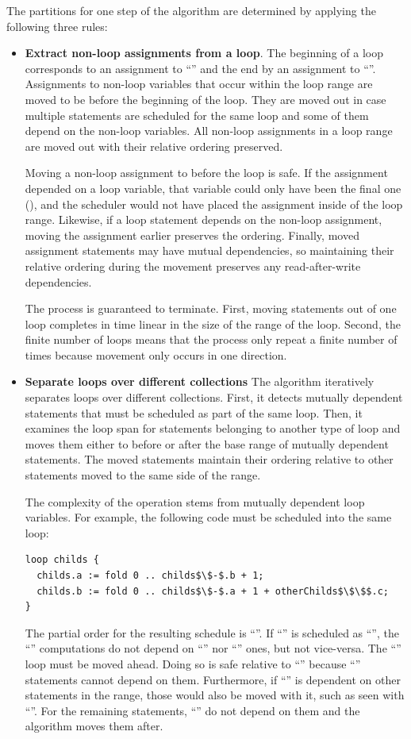 The partitions for one step of the algorithm are determined by applying the following three rules:
\begin{itemize}
\item \textbf{Extract non-loop assignments from a loop}. The beginning of a loop corresponds to an assignment to ``'' and the end by an assignment to ``''. Assignments to non-loop variables that occur within the loop range are moved to be before the beginning of the loop. They are moved out in case multiple statements are scheduled for the same loop and some of them depend on the non-loop variables. All non-loop assignments in a loop range are moved out with their relative ordering preserved.

Moving a non-loop assignment to before the loop is safe. If the assignment depended on a loop variable, that variable could only have been the final one (), and the scheduler would not have placed the assignment inside of the loop range. Likewise, if a loop statement depends on the non-loop assignment, moving the assignment earlier preserves the ordering. Finally, moved assignment statements may have mutual dependencies, so maintaining their relative ordering during the movement preserves any read-after-write dependencies.

The process is guaranteed to terminate. First, moving statements out of one loop completes in time linear in the size of the range of the loop. Second, the finite number of loops means that the process only repeat a finite number of times because movement only occurs in one direction.

\item \textbf{Separate loops over different collections} The algorithm iteratively separates loops over different collections. First, it detects mutually dependent statements that must be scheduled as part of the same loop. Then, it examines the loop span for statements belonging to another type of loop and moves them either to before or after the base range of mutually dependent statements.  The moved statements maintain their ordering relative to other statements moved to the same side of the range.

The complexity of the operation stems from mutually dependent loop variables. For example, the following code must be scheduled into the same loop:
\begin{lstlisting}[mathescape]
loop childs {
  childs.a := fold 0 .. childs$\$-$.b + 1;
  childs.b := fold 0 .. childs$\$-$.a + 1 + otherChilds$\$\$$.c;
}
\end{lstlisting}
The partial order for the resulting schedule is ``''. If ``'' is scheduled as ``'', the ``'' computations do not depend on ``'' nor ``'' ones, but not vice-versa. The ``'' loop must be moved ahead. Doing so is safe relative to ``'' because ``'' statements cannot depend on them. Furthermore, if ``'' is dependent on other statements in the range, those would also be moved with it, such as seen with ``''.  For the remaining statements, ``'' do not depend on them and the algorithm moves them after.


\end{itemize}
